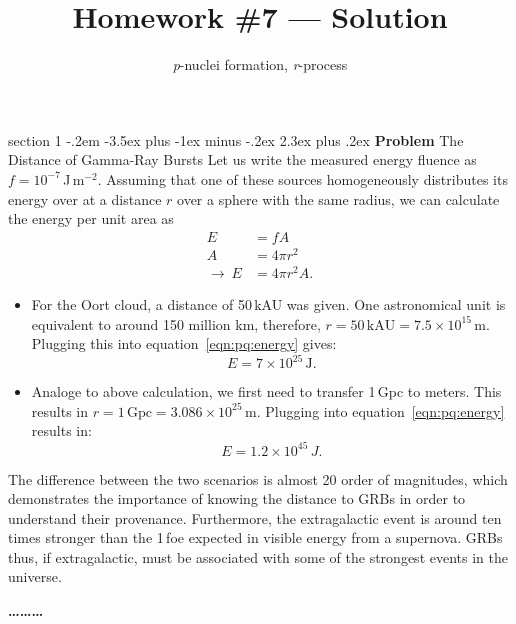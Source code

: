 \documentclass[letterpaper,12pt,twoside=false,DIV=11]{scrartcl}
\makeatletter
\newcommand{\topic}{\author}
\newenvironment{problem}{\@startsection
    {section}
    {1}
    {-.2em}
    {-3.5ex plus -1ex minus -.2ex}
    {2.3ex plus .2ex}
    {
        \pagebreak[3] %
        \noindent\sffamily\bfseries Problem
    }
}
{
    \begin{center}\large\bfseries\ldots\ldots\ldots\end{center}
}
\makeatother
\begin{document}
\title{Homework \#7 --- Solution}
\topic{\textit{p}-nuclei formation, \textit{r}-process}
\date{}

\maketitle
\thispagestyle{fancy}


\begin{problem}{The Distance of Gamma-Ray Bursts}
Let us write the measured energy fluence as $f = 10^{-7}$\,J\,m$^{-2}$. Assuming that one of these sources homogeneously distributes its energy over at a distance $r$ over a sphere with the same radius, we can calculate the energy per unit area as
\begin{align}
    E &= fA  \\
    A &= 4 \pi r^{2} \\
    \rightarrow\ E &= 4\pi r^{2} A. \label{eqn:pq:energy}
\end{align}

\begin{itemize}
    \item For the Oort cloud, a distance of 50\,kAU was given. One astronomical unit is equivalent to around 150 million km, therefore, $r=50\,\mathrm{kAU} = 7.5\times10^{15}$\,m. Plugging this into equation~\ref{eqn:pq:energy} gives:
    \begin{equation}
        E = 7 \times 10^{25}\,\mathrm{J}.
    \end{equation}
    \item Analoge to above calculation, we first need to transfer 1\,Gpc to meters. This results in $r = 1\,\mathrm{Gpc} = 3.086\times10^{25}\,\mathrm{m}$. Plugging into equation~\ref{eqn:pq:energy} results in:
    \begin{equation}
        E = 1.2\times10^{45}\,J.
    \end{equation}
\end{itemize}
The difference between the two scenarios is almost 20 order of magnitudes, which demonstrates the importance of knowing the distance to GRBs in order to understand their provenance. Furthermore, the extragalactic event is around ten times stronger than the 1\,foe expected in visible energy from a supernova. GRBs thus, if extragalactic, must be associated with some of the strongest events in the universe.
\end{problem}
\end{document}
